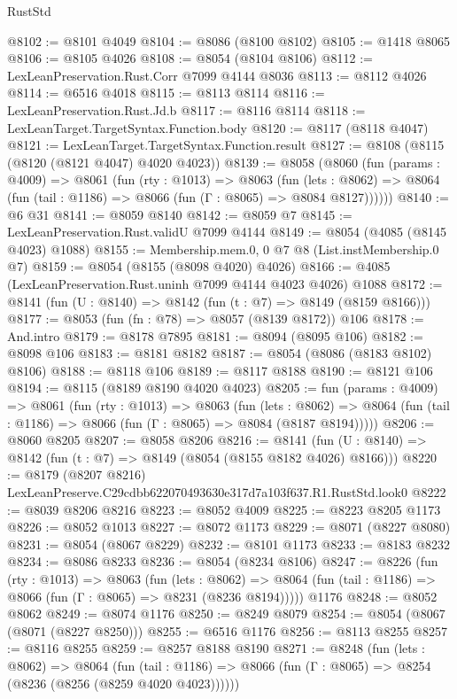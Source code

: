 \begin{lexlean}{RustStd}
\begin{coremodule}
@8102 := @8101 @4049
@8104 := @8086 (@8100 @8102)
@8105 := @1418 @8065
@8106 := @8105 @4026
@8108 := @8054 (@8104 @8106)
@8112 := LexLeanPreservation.Rust.Corr @7099 @4144 @8036
@8113 := @8112 @4026
@8114 := @6516 @4018
@8115 := @8113 @8114
@8116 := LexLeanPreservation.Rust.Jd.b
@8117 := @8116 @8114
@8118 := LexLeanTarget.TargetSyntax.Function.body
@8120 := @8117 (@8118 @4047)
@8121 := LexLeanTarget.TargetSyntax.Function.result
@8127 := @8108 (@8115 (@8120 (@8121 @4047) @4020 @4023))
@8139 := @8058
    (@8060
      (fun (params : @4009) =>
      @8061
        (fun (rty : @1013) =>
        @8063
          (fun (lets : @8062) =>
          @8064 (fun (tail : @1186) => @8066 (fun (Γ : @8065) => @8084 @8127))))))
@8140 := @6 @31
@8141 := @8059 @8140
@8142 := @8059 @7
@8145 := LexLeanPreservation.Rust.validU @7099 @4144
@8149 := @8054 (@4085 (@8145 @4023) @1088)
@8155 := Membership.mem.{0, 0} @7 @8 (List.instMembership.{0} @7)
@8159 := @8054 (@8155 (@8098 @4020) @4026)
@8166 := @4085 (LexLeanPreservation.Rust.uninh @7099 @4144 @4023 @4026) @1088
@8172 := @8141 (fun (U : @8140) => @8142 (fun (t : @7) => @8149 (@8159 @8166)))
@8177 := @8053 (fun (fn : @78) => @8057 (@8139 @8172)) @106
@8178 := And.intro
@8179 := @8178 @7895
@8181 := @8094 (@8095 @106)
@8182 := @8098 @106
@8183 := @8181 @8182
@8187 := @8054 (@8086 (@8183 @8102) @8106)
@8188 := @8118 @106
@8189 := @8117 @8188
@8190 := @8121 @106
@8194 := @8115 (@8189 @8190 @4020 @4023)
@8205 := fun (params : @4009) =>
  @8061
    (fun (rty : @1013) =>
    @8063
      (fun (lets : @8062) =>
      @8064 (fun (tail : @1186) => @8066 (fun (Γ : @8065) => @8084 (@8187 @8194)))))
@8206 := @8060 @8205
@8207 := @8058 @8206
@8216 := @8141 (fun (U : @8140) => @8142 (fun (t : @7) => @8149 (@8054 (@8155 @8182 @4026) @8166)))
@8220 := @8179 (@8207 @8216) LexLeanPreserve.C29cdbb622070493630e317d7a103f637.R1.RustStd.look0
@8222 := @8039 @8206 @8216
@8223 := @8052 @4009
@8225 := @8223 @8205 @1173
@8226 := @8052 @1013
@8227 := @8072 @1173
@8229 := @8071 (@8227 @8080)
@8231 := @8054 (@8067 @8229)
@8232 := @8101 @1173
@8233 := @8183 @8232
@8234 := @8086 @8233
@8236 := @8054 (@8234 @8106)
@8247 := @8226
    (fun (rty : @1013) =>
    @8063
      (fun (lets : @8062) =>
      @8064 (fun (tail : @1186) => @8066 (fun (Γ : @8065) => @8231 (@8236 @8194)))))
    @1176
@8248 := @8052 @8062
@8249 := @8074 @1176
@8250 := @8249 @8079
@8254 := @8054 (@8067 (@8071 (@8227 @8250)))
@8255 := @6516 @1176
@8256 := @8113 @8255
@8257 := @8116 @8255
@8259 := @8257 @8188 @8190
@8271 := @8248
    (fun (lets : @8062) =>
    @8064
      (fun (tail : @1186) => @8066 (fun (Γ : @8065) => @8254 (@8236 (@8256 (@8259 @4020 @4023))))))

\end{coremodule}
\end{lexlean}
